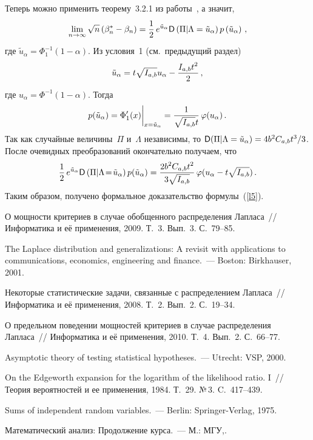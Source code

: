 \begin{multicols}{2}
Теперь можно применить теорему~3.2.1 из работы~\cite{bening}, а значит,
$$
\lim\limits_{n \to \infty} \sqrt{n} \left(\beta_n^{*}-\beta_n\right) = \displaystyle\frac{\displaystyle 1\mathstrut}{\displaystyle 2\mathstrut}\, 
e^{\tilde{u}_{\alpha}} {\sf D}\left(\Pi | \Lambda = \tilde{u}_{\alpha}\right) p\left(\tilde{u}_{\alpha}\right)\,,
$$
где $\tilde{u}_{\alpha} = \Phi_1^{-1}(1-\alpha)$. Из условия~1 (см.\ предыдущий раздел)
$$
\tilde{u}_{\alpha} = t\sqrt{I_{a,b}}u_{\alpha} - \displaystyle\frac{\displaystyle I_{a,b} t^2\mathstrut}{\displaystyle 2\mathstrut}\,,
$$
где $u_{\alpha}=\Phi^{-1}(1-\alpha)$. Тогда
$$
p(\tilde{u}_{\alpha}) = \Phi_1'(x)\biggr|_{x=\tilde{u}_{\alpha}} = \displaystyle\frac{\displaystyle 1\mathstrut}{\displaystyle \sqrt{I_{a,b}}t\mathstrut} \, \varphi({u_{\alpha}})\,.
$$
Так как случайные величины~$\Pi$ и~$\Lambda$ независимы, то 
${\sf D}(\Pi|\Lambda=\tilde{u}_{\alpha}) = 4b^2C_{a,b} t^3/3$. 
После очевидных преобразований окончательно получаем, что
$$
\displaystyle\frac{\displaystyle 1\mathstrut}{\displaystyle 2\mathstrut} \, e^{\tilde{u}_{\alpha}} {\sf D}\left(\Pi | \Lambda \!=\! 
\tilde{u}_{\alpha}\right) p(\tilde{u}_{\alpha}) = \displaystyle\frac{\displaystyle 2b^2C_{a,b} t^2\mathstrut}{\displaystyle 3\sqrt{I_{a,b}}\mathstrut} \, \varphi(u_{\alpha}-t\sqrt{I_{a,b}})\,.
$$
Таким образом, получено формальное доказательство формулы~(\ref{l5}).


{\small\frenchspacing
{%
\begin{thebibliography}{9}

О мощности критериев в случае обобщенного распределения Лапласа~// Информатика и её применения, 2009. Т.~3. Вып.~3. 
С.~79--85.

The Laplace distribution and generalizations: A revisit with applications to communications, economics, engineering and 
finance.~--- Boston: Birkhauser, 2001.

Некоторые статистические задачи, связанные с распределением Лапласа~// Информатика и её применения, 2008. Т.~2. Вып.~2. 
С.~19--34.

 О предельном поведении мощностей критериев в случае распределения Лапласа~// 
Информатика и её применения, 2010. Т.~4. Вып.~2. С.~66--77.

 Asymptotic theory of testing statistical hypotheses.~--- Utrecht: VSP, 2000.

 On the Edgeworth expansion for the logarithm of the likelihood ratio. I~// 
Теория вероятностей и ее применения, 1984. Т.~29. №\,3. C.~417--439.



 Sums of independent random variables.~--- Berlin: Springer-Verlag, 1975.

\label{end\stat}

 Математический анализ: Продолжение курса.~--- М.: МГУ,.
 \end{thebibliography}
 }}\end{multicols}